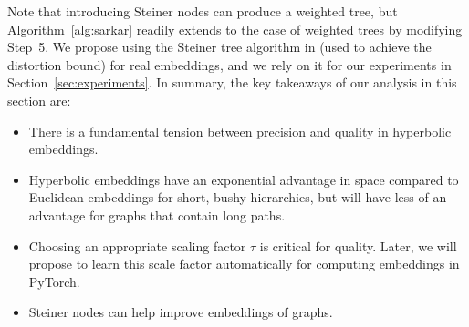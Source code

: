 Note that introducing Steiner nodes can produce a weighted tree, but Algorithm~\ref{alg:sarkar} readily extends to the case of weighted trees by modifying Step~5.
We propose using the Steiner tree algorithm in \citet{Abraham} (used to achieve the distortion bound) for real embeddings, and we rely on it for our experiments in Section~\ref{sec:experiments}. In summary, 
the key takeaways of our analysis in this section are:
\begin{itemize}
\item
There is a fundamental tension between precision and quality in
hyperbolic embeddings.

\item Hyperbolic embeddings have an exponential advantage in space compared to Euclidean embeddings for short, bushy hierarchies, but will have less of an advantage
for graphs that contain long paths.

\item Choosing an appropriate scaling factor $\tau$ is critical for quality.
Later, we will propose to learn this scale factor automatically for computing embeddings in PyTorch.
\item Steiner nodes can help improve embeddings of graphs.
\end{itemize}




